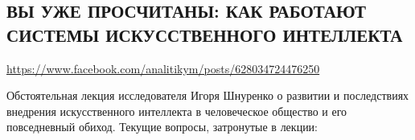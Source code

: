  
 
  
\clearpage
\subsection{ВЫ УЖЕ ПРОСЧИТАНЫ: КАК РАБОТАЮТ СИСТЕМЫ ИСКУССТВЕННОГО ИНТЕЛЛЕКТА}
\label{sec:26_07_2020.fb.lnr.4}
\url{https://www.facebook.com/analitikym/posts/628034724476250}


Обстоятельная лекция исследователя Игоря Шнуренко о развитии и последствиях внедрения искусственного интеллекта в человеческое общество и его повседневный обиход. Текущие вопросы, затронутые в лекции:

